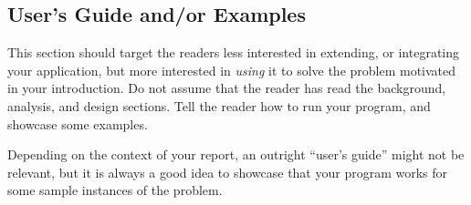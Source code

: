 \subsection{User's Guide and/or Examples}

\label{sec:users-guide-and-examples}

This section should target the readers less interested in extending,
or integrating your application, but more interested in \emph{using}
it to solve the problem motivated in your introduction. Do not assume
that the reader has read the background, analysis, and design
sections. Tell the reader how to run your program, and showcase some
examples.

Depending on the context of your report, an outright ``user's guide''
might not be relevant, but it is always a good idea to showcase that
your program works for some sample instances of the problem.
